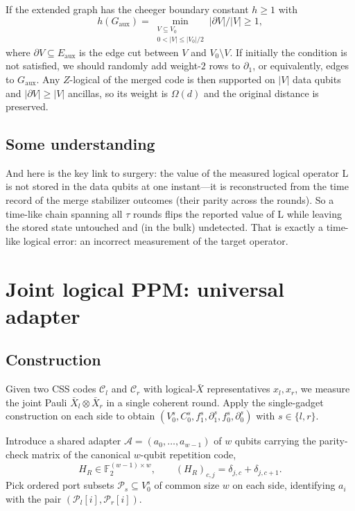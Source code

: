 \documentclass[a4paper, 12pt]{article}
\begin{document}
  If the extended graph has the cheeger boundary constant $h \geq 1$ with
\begin{equation}
  h(G_{\mathrm{aux}}) = \min_{\substack{V \subseteq V_0 \\ 0 < |V| \leq |V_0|/2}} |\partial
  V|/|V| \geq 1,
  \end{equation}
  where $\partial V \subseteq E_{\mathrm{aux}}$ is the edge cut between $V$ and $V_0 \setminus V$. If initially the condition is not satisfied, we should randomly add weight-$2$ rows to $\partial_1$, or equivalently, edges to $G_{\mathrm{aux}}$. Any $Z$-logical of the merged code is then supported on $|V|$ data qubits and
  $|\partial V| \geq |V|$ ancillas, so its weight is $\Omega(d)$ and the original distance is preserved.

  \subsection{Some understanding}

  And here is the key link to surgery: the value of the measured logical operator L is not stored in the
  data qubits at one instant---it is reconstructed from the time record of the merge stabilizer outcomes
  (their parity across the rounds). So a time-like chain spanning all $\tau$ rounds flips the reported value
  of L while leaving the stored state untouched and (in the bulk) undetected. That is exactly a time-like
  logical error: an incorrect measurement of the target operator.

\section{Joint logical PPM: universal adapter}

\subsection{Construction}

  Given two CSS codes $\mathcal{C}_l$ and $\mathcal{C}_r$ with logical-$\bar X$ representatives $x_l, x_r$,
   we measure the joint Pauli $\bar X_l \otimes \bar X_r$ in a single coherent round. Apply the
  single-gadget construction on each side to obtain $(V_0^s, C_0^s, f_1^{s}, \partial_1^{s}, f_0^s, \partial_0^{s})$ with $s \in \{l, r\}$.
  
  Introduce a shared adapter $\mathcal{A} = (a_0, \dots, a_{w-1})$ of $w$ qubits carrying the parity-check
  matrix of the canonical $w$-qubit repetition code,
  \begin{equation}
  H_R \in \mathbb{F}_2^{(w-1)\times w}, \qquad (H_R)_{c, j} = \delta_{j, c} + \delta_{j, c+1}.
  \end{equation}
  Pick ordered port subsets $\mathcal{P}_s \subseteq V_0^s$ of common size $w$ on each side, identifying
  $a_i$ with the pair $(\mathcal{P}_l[i], \mathcal{P}_r[i])$.
\end{document}
